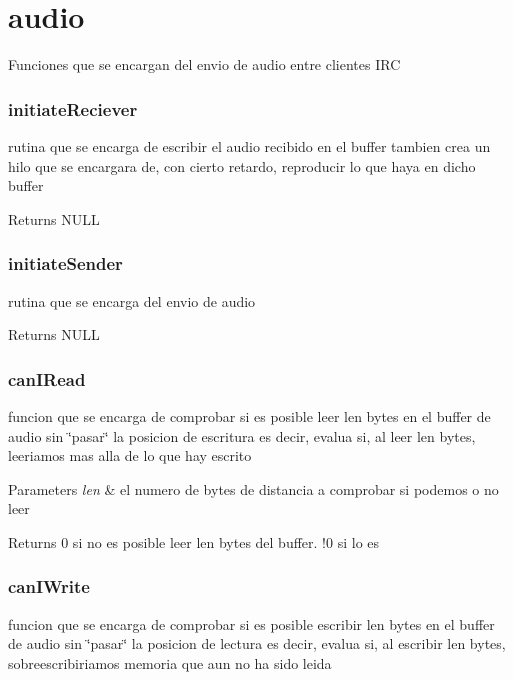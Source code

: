 \hypertarget{group___i_r_c_audio}{\section{audio}
\label{group___i_r_c_audio}
}
Funciones que se encargan del envio de audio entre clientes I\-R\-C



 \hypertarget{initiateReciever}{}\subsubsection{initiate\-Reciever}\label{initiateReciever}
rutina que se encarga de escribir el audio recibido en el buffer tambien crea un hilo que se encargara de, con cierto retardo, reproducir lo que haya en dicho buffer

\begin{DoxyReturn}{Returns}
N\-U\-L\-L
\end{DoxyReturn}


 \hypertarget{initiateSender}{}\subsubsection{initiate\-Sender}\label{initiateSender}
rutina que se encarga del envio de audio

\begin{DoxyReturn}{Returns}
N\-U\-L\-L
\end{DoxyReturn}


 \hypertarget{canIRead}{}\subsubsection{can\-I\-Read}\label{canIRead}
funcion que se encarga de comprobar si es posible leer len bytes en el buffer de audio sin \char`\"{}pasar\char`\"{} la posicion de escritura es decir, evalua si, al leer len bytes, leeriamos mas alla de lo que hay escrito


\begin{DoxyParams}{Parameters}
{\em len} & el numero de bytes de distancia a comprobar si podemos o no leer\\
\hline
\end{DoxyParams}
\begin{DoxyReturn}{Returns}
0 si no es posible leer len bytes del buffer. !0 si lo es
\end{DoxyReturn}


 \hypertarget{canIWrite}{}\subsubsection{can\-I\-Write}\label{canIWrite}
funcion que se encarga de comprobar si es posible escribir len bytes en el buffer de audio sin \char`\"{}pasar\char`\"{} la posicion de lectura es decir, evalua si, al escribir len bytes, sobreescribiriamos memoria que aun no ha sido leida


